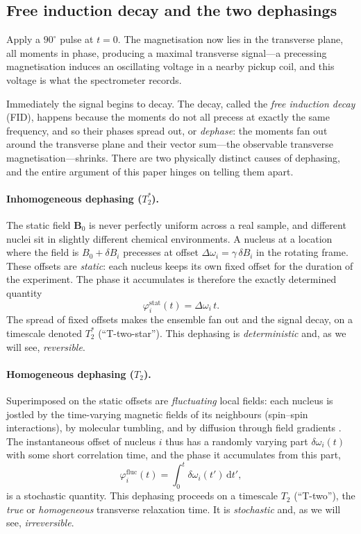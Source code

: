 \documentclass[11pt,a4paper]{article}
\theoremstyle{thmstyle}
\theoremstyle{definition}
\theoremstyle{remark}
\newcommand{\Tprep}{T_{2}^{*}}
\newcommand{\Ttwo}{T_{2}}
\begin{document}
\subsection{Free induction decay and the two dephasings}
\label{sec:fid}

Apply a $90^{\circ}$ pulse at $t=0$. The magnetisation now lies in the
transverse plane, all moments in phase, producing a maximal transverse
signal---a precessing magnetisation induces an oscillating voltage in a
nearby pickup coil, and this voltage is what the spectrometer records.

Immediately the signal begins to decay. The decay, called the \emph{free
induction decay} (FID), happens because the moments do not all precess at
exactly the same frequency, and so their phases spread out, or
\emph{dephase}: the moments fan out around the transverse plane and their
vector sum---the observable transverse magnetisation---shrinks. There are
two physically distinct causes of dephasing, and the entire argument of
this paper hinges on telling them apart.

\paragraph{Inhomogeneous dephasing ($\Tprep$).} The static field $\bm{B}_0$
is never perfectly uniform across a real sample, and different nuclei sit
in slightly different chemical environments. A nucleus at a location where
the field is $B_{0}+\delta B_{i}$ precesses at offset
$\Delta\omega_{i}=\gamma\,\delta B_{i}$ in the rotating frame. These
offsets are \emph{static}: each nucleus keeps its own fixed offset for
the duration of the experiment. The phase it accumulates is therefore the
exactly determined quantity
\begin{equation}
\varphi_{i}^{\mathrm{stat}}(t) = \Delta\omega_{i}\,t .
\label{eq:phistat}
\end{equation}
The spread of fixed offsets makes the ensemble fan out and the signal
decay, on a timescale denoted $\Tprep$ (``T-two-star''). This dephasing
is \emph{deterministic} and, as we will see, \emph{reversible}.

\paragraph{Homogeneous dephasing ($\Ttwo$).} Superimposed on the static
offsets are \emph{fluctuating} local fields: each nucleus is jostled by
the time-varying magnetic fields of its neighbours (spin--spin
interactions), by molecular tumbling, and by diffusion through field
gradients \citep{bloch1946,bpp1948}. The instantaneous offset of nucleus
$i$ thus has a randomly varying part $\delta\omega_{i}(t)$ with some short
correlation time, and the phase it accumulates from this part,
\begin{equation}
\varphi_{i}^{\mathrm{fluc}}(t) = \int_{0}^{t}\delta\omega_{i}(t')\,
\mathrm{d}t',
\label{eq:phifluc}
\end{equation}
is a stochastic quantity. This dephasing proceeds on a timescale
$\Ttwo$ (``T-two''), the \emph{true} or \emph{homogeneous} transverse
relaxation time. It is \emph{stochastic} and, as we will see,
\emph{irreversible}.
\end{document}
